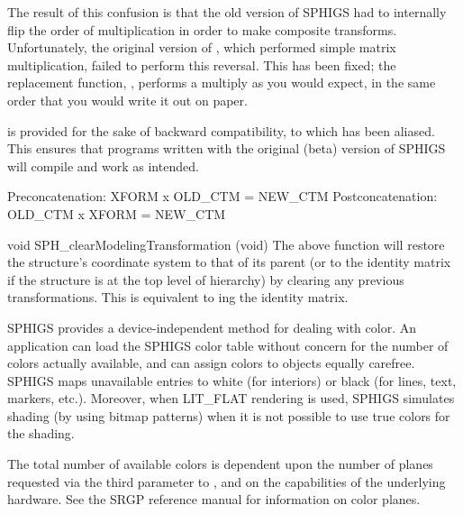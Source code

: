 \newpar
The result of this confusion is that the old version of SPHIGS
had to internally flip the order of multiplication in order to make
composite transforms.  Unfortunately, the original version of
, which performed simple matrix multiplication, failed to
perform this reversal.  This has been fixed; the replacement function,
, performs a multiply as you would expect, in the
same order that you would write it out on paper.

\newpar
{} is provided for the sake of backward
compatibility, to which  has been aliased.  This ensures
that programs written with the original (beta) version of SPHIGS will
compile and work as intended.

\newpar
{}

\begincode
Preconcatenation:    XFORM x OLD\_CTM = NEW\_CTM
Postconcatenation:   OLD\_CTM x XFORM = NEW\_CTM
\endcode

\newpar
\begincode
void SPH_clearModelingTransformation (void)
\endcode
The above function will restore the structure's coordinate system to
that of its parent (or to the identity matrix if the structure is at
the top level of hierarchy) by clearing any previous transformations.
This is equivalent to ing the identity matrix.



SPHIGS provides a device-independent method for dealing with color.  An
application can load the SPHIGS color table without concern for the number of
colors actually available, and can assign colors to objects equally carefree.
SPHIGS maps unavailable entries to white (for interiors) or black (for lines,
text, markers, etc.).  Moreover, when LIT\_FLAT rendering is used, SPHIGS
simulates shading (by using bitmap patterns) when it is not possible to use
true colors for the shading.

\newpar
The total number of available colors is dependent upon the number of planes
requested via the third parameter to
, and on the capabilities of the underlying hardware.  
See the SRGP reference manual for information on color planes.

